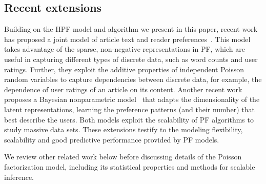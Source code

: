 \subsection{Recent extensions}
Building on the HPF model and algorithm we present in this paper,
recent work has proposed a joint model of article text and reader
preferences~\cite{gopalan2014content}. This model takes advantage of
the sparse, non-negative representations in PF, which are useful in
capturing different types of discrete data, such as word counts and
user ratings. Further, they exploit the additive properties of
independent Poisson random variables to capture dependencies between
discrete data, for example, the dependence of user ratings of an
article on its content. Another recent work proposes a Bayesian
nonparametric model~\cite{gopalan2014bayesian} that adapts the
dimensionality of the latent representations, learning the preference
patterns (and their number) that best describe the users. Both models
exploit the scalability of PF algorithms to study massive data sets.
These extensions testify to the modeling flexibility, scalability and
good predictive performance provided by PF models.

We review other related work below before discussing details of the
Poisson factorization model, including its statistical properties and
methods for scalable inference.






